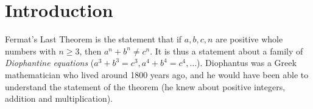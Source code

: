 \chapter{Introduction}

Fermat's Last Theorem is the statement that if $a,b,c,n$ are positive whole numbers with $n\geq 3$, then $a^n+b^n\not=c^n$. It is thus a statement about a family of \emph{Diophantine equations} ($a^3+b^3=c^3, a^4+b^4=c^4,\ldots$). Diophantus was a Greek mathematician who lived around 1800 years ago, and he would have been able to understand the statement of the theorem (he knew about positive integers, addition and multiplication).

